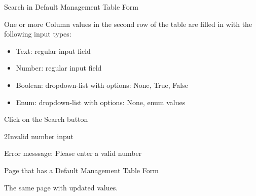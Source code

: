 
\begin{uc}{Search in Default Management Table Form}

    \begin{uc-mss}
        \item One or more Column values in the second row of the table are filled in with
        the following input types:
        \begin{itemize}
            \item Text: regular input field
            \item Number: regular input field
            \item Boolean: dropdown-list with options: None, True, False
            \item Enum: dropdown-list with options: None, {enum values}
        \end{itemize}
        \item Click on the Search button
    \end{uc-mss}

    \begin{uc-ext}

        \begin{uc-fail}{2}{Invalid number input}
        \item Error messsage: Please enter a valid number
        \end{uc-fail}


    \end{uc-ext}

    \begin{uc-pre}
    \item Page that has a Default Management Table Form
    \end{uc-pre}

    \begin{uc-post}
    \item The same page with updated values.
    \end{uc-post}

\end{uc}

